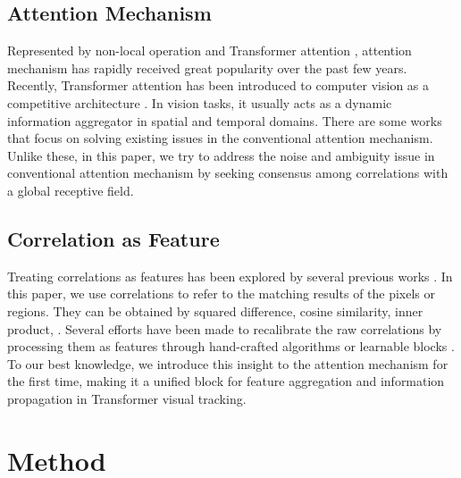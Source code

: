 \subsection{Attention Mechanism}
Represented by non-local operation \cite{wang2018non} and Transformer attention \cite{vaswani2017attention}, attention mechanism has rapidly received great popularity over the past few years. Recently, Transformer attention has been introduced to computer vision as a competitive architecture \cite{carion2020end,zhu2020deformable,dosovitskiy2020image}. In vision tasks, it usually acts as a dynamic information aggregator in spatial and temporal domains. There are some works \cite{huang2019attention,huang2019ccnet} that focus on solving existing issues in the conventional attention mechanism. Unlike these, in this paper, we try to address the noise and ambiguity issue in conventional attention mechanism by seeking consensus among correlations with a global receptive field.

\subsection{Correlation as Feature}
Treating correlations as features has been explored by several previous works \cite{shechtman2007matching,sattler2009scramsac,bian2017gms,rocco2018neighbourhood,li2020correspondence,min2021convolutional,rocco2020efficient,cho2021cats,bhat2020know}. In this paper, we use correlations to refer to the matching results of the pixels or regions. They can be obtained by squared difference, cosine similarity, inner product, \etc. Several efforts have been made to recalibrate the raw correlations by processing them as features through hand-crafted algorithms \cite{sattler2009scramsac,bian2017gms} or learnable blocks \cite{rocco2018neighbourhood,min2021convolutional,li2020correspondence,bhat2020know,rocco2020efficient,cho2021cats}. To our best knowledge, we introduce this insight to the attention mechanism for the first time, making it a unified block for feature aggregation and information propagation in Transformer visual tracking.

\section{Method}

